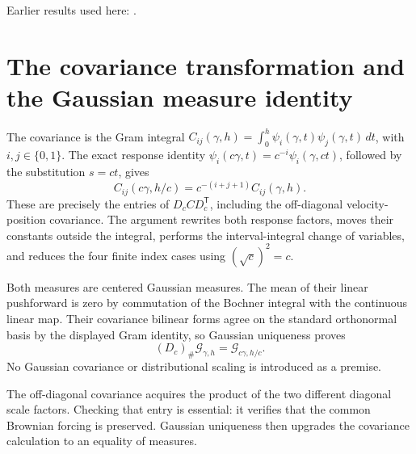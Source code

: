 \documentclass[11pt,a4paper]{article}
\begin{document}
Earlier results used here: \cite[Section~3.10.11]{LangevinLean2026Kinetic}.

\section{\texorpdfstring{The covariance transformation and the Gaussian measure identity}{The covariance transformation and the Gaussian measure identity}}


The covariance is the Gram integral \(C_{ij}(\gamma,h)=\int_0^h\psi_i(\gamma,t)\psi_j(\gamma,t)\,dt\), with \(i,j\in\{0,1\}\). The exact response identity \(\psi_i(c\gamma,t)=c^{-i}\psi_i(\gamma,ct)\), followed by the substitution \(s=ct\), gives \[C_{ij}(c\gamma,h/c)=c^{-(i+j+1)}C_{ij}(\gamma,h).\] These are precisely the entries of \(D_c C D_c^\mathsf T\), including the off-diagonal velocity-position covariance. The argument rewrites both response factors, moves their constants outside the integral, performs the interval-integral change of variables, and reduces the four finite index cases using \((\sqrt c)^2=c\).



Both measures are centered Gaussian measures. The mean of their linear pushforward is zero by commutation of the Bochner integral with the continuous linear map. Their covariance bilinear forms agree on the standard orthonormal basis by the displayed Gram identity, so Gaussian uniqueness proves \[(D_c)_\#\mathcal G_{\gamma,h}=\mathcal G_{c\gamma,h/c}.\] No Gaussian covariance or distributional scaling is introduced as a premise.



The off-diagonal covariance acquires the product of the two different diagonal scale factors. Checking that entry is essential: it verifies that the common Brownian forcing is preserved. Gaussian uniqueness then upgrades the covariance calculation to an equality of measures.
\end{document}

